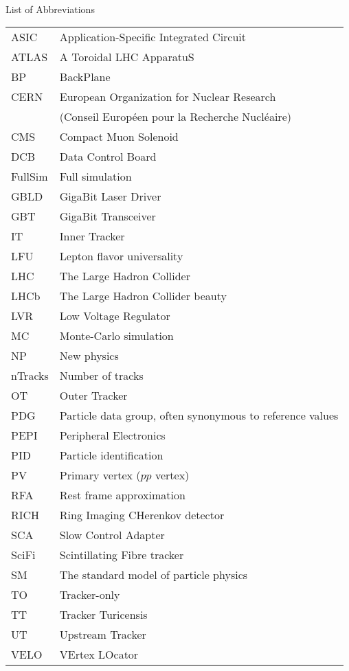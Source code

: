 \singlespacing \normalsize
\hbox{\ }

\vspace{.5in}

\begin{center}
\large{List of Abbreviations}
\end{center}

\vspace{3pt}

\begin{supertabular}{ll}
    ASIC    & Application-Specific Integrated Circuit \\
    ATLAS   & A Toroidal LHC ApparatuS \\
    BP      & BackPlane \\
    CERN    & European Organization for Nuclear Research \\
            & (Conseil Européen pour la Recherche Nucléaire) \\
    CMS     & Compact Muon Solenoid \\
    DCB     & Data Control Board \\
    FullSim & Full simulation \\
    GBLD    & GigaBit Laser Driver \\
    GBT     & GigaBit Transceiver \\
    IT      & Inner Tracker \\
    LFU     & Lepton flavor universality \\
    LHC     & The Large Hadron Collider \\
    LHCb    & The Large Hadron Collider beauty \\
    LVR     & Low Voltage Regulator \\
    MC      & Monte-Carlo simulation \\
    NP      & New physics \\
    nTracks & Number of tracks \\
    OT      & Outer Tracker \\
    PDG     & Particle data group, often synonymous to reference values \\
    PEPI    & Peripheral Electronics \\
    PID     & Particle identification \\
    PV      & Primary vertex ($pp$ vertex) \\
    RFA     & Rest frame approximation \\
    RICH    & Ring Imaging CHerenkov detector \\
    SCA     & Slow Control Adapter \\
    SciFi   & Scintillating Fibre tracker \\
    SM      & The standard model of particle physics \\
    TO      & Tracker-only \\
    TT      & Tracker Turicensis \\
    UT      & Upstream Tracker \\
    VELO    & VErtex LOcator \\
\end{supertabular}
